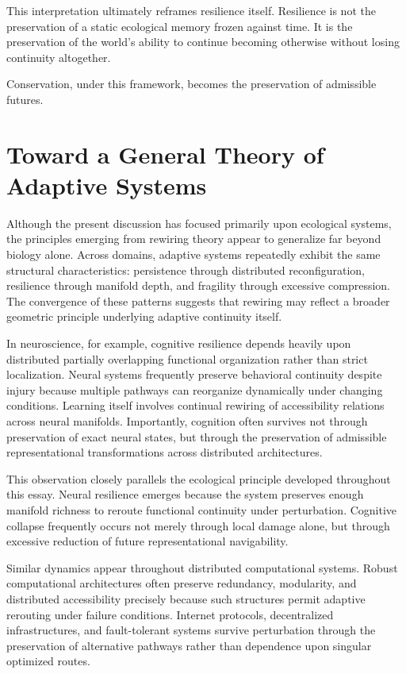 \documentclass[11pt,a4paper]{article}
\begin{document}
This interpretation ultimately reframes resilience itself. Resilience is not the preservation of a static ecological memory frozen against time. It is the preservation of the world's ability to continue becoming otherwise without losing continuity altogether.

Conservation, under this framework, becomes the preservation of admissible futures.

\newpage

\section{Toward a General Theory of Adaptive Systems}

Although the present discussion has focused primarily upon ecological systems, the principles emerging from rewiring theory appear to generalize far beyond biology alone. Across domains, adaptive systems repeatedly exhibit the same structural characteristics: persistence through distributed reconfiguration, resilience through manifold depth, and fragility through excessive compression. The convergence of these patterns suggests that rewiring may reflect a broader geometric principle underlying adaptive continuity itself.

In neuroscience, for example, cognitive resilience depends heavily upon distributed partially overlapping functional organization rather than strict localization. Neural systems frequently preserve behavioral continuity despite injury because multiple pathways can reorganize dynamically under changing conditions. Learning itself involves continual rewiring of accessibility relations across neural manifolds. Importantly, cognition often survives not through preservation of exact neural states, but through the preservation of admissible representational transformations across distributed architectures.

This observation closely parallels the ecological principle developed throughout this essay. Neural resilience emerges because the system preserves enough manifold richness to reroute functional continuity under perturbation. Cognitive collapse frequently occurs not merely through local damage alone, but through excessive reduction of future representational navigability.

Similar dynamics appear throughout distributed computational systems. Robust computational architectures often preserve redundancy, modularity, and distributed accessibility precisely because such structures permit adaptive rerouting under failure conditions. Internet protocols, decentralized infrastructures, and fault-tolerant systems survive perturbation through the preservation of alternative pathways rather than dependence upon singular optimized routes.
\end{document}
